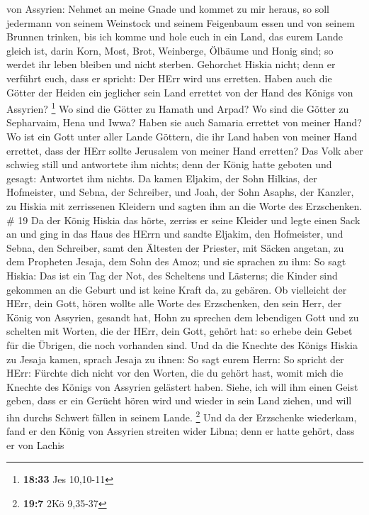 von Assyrien: Nehmet an meine Gnade und kommet zu mir heraus, so soll
jedermann von seinem Weinstock und seinem Feigenbaum essen und von
seinem Brunnen trinken,  bis ich komme und hole euch in ein
Land, das eurem Lande gleich ist, darin Korn, Most, Brot, Weinberge,
Ölbäume und Honig sind; so werdet ihr leben bleiben und nicht sterben.
Gehorchet Hiskia nicht; denn er verführt euch, dass er spricht: Der HErr
wird uns erretten.  Haben auch die Götter der Heiden ein
jeglicher sein Land errettet von der Hand des Königs von Assyrien?
\footnote{\textbf{18:33} Jes 10,10-11}  Wo sind die Götter
zu Hamath und Arpad? Wo sind die Götter zu Sepharvaim, Hena und Iwwa?
Haben sie auch Samaria errettet von meiner Hand?  Wo ist
ein Gott unter aller Lande Göttern, die ihr Land haben von meiner Hand
errettet, dass der HErr sollte Jerusalem von meiner Hand erretten?
 Das Volk aber schwieg still und antwortete ihm nichts;
denn der König hatte geboten und gesagt: Antwortet ihm nichts.
 Da kamen Eljakim, der Sohn Hilkias, der Hofmeister, und
Sebna, der Schreiber, und Joah, der Sohn Asaphs, der Kanzler, zu Hiskia
mit zerrissenen Kleidern und sagten ihm an die Worte des Erzschenken. \#
19  Da der König Hiskia das hörte, zerriss er seine Kleider
und legte einen Sack an und ging in das Haus des HErrn  und
sandte Eljakim, den Hofmeister, und Sebna, den Schreiber, samt den
Ältesten der Priester, mit Säcken angetan, zu dem Propheten Jesaja, dem
Sohn des Amoz;  und sie sprachen zu ihm: So sagt Hiskia: Das
ist ein Tag der Not, des Scheltens und Lästerns; die Kinder sind
gekommen an die Geburt und ist keine Kraft da, zu gebären. 
Ob vielleicht der HErr, dein Gott, hören wollte alle Worte des
Erzschenken, den sein Herr, der König von Assyrien, gesandt hat, Hohn zu
sprechen dem lebendigen Gott und zu schelten mit Worten, die der HErr,
dein Gott, gehört hat: so erhebe dein Gebet für die Übrigen, die noch
vorhanden sind.  Und da die Knechte des Königs Hiskia zu
Jesaja kamen,  sprach Jesaja zu ihnen: So sagt eurem Herrn:
So spricht der HErr: Fürchte dich nicht vor den Worten, die du gehört
hast, womit mich die Knechte des Königs von Assyrien gelästert haben.
 Siehe, ich will ihm einen Geist geben, dass er ein Gerücht
hören wird und wieder in sein Land ziehen, und will ihn durchs Schwert
fällen in seinem Lande. \footnote{\textbf{19:7} 2Kö 9,35-37}
 Und da der Erzschenke wiederkam, fand er den König von
Assyrien streiten wider Libna; denn er hatte gehört, dass er von Lachis
